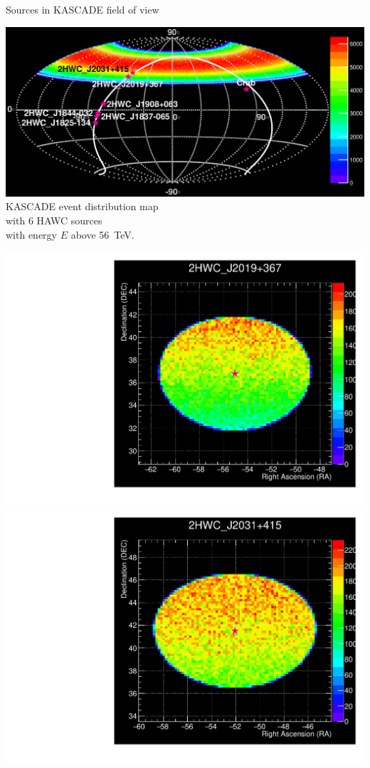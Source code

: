 \begin{frame}{Sources in KASCADE field of view}
\begin{minipage}[c]{0.73\textwidth}
\begin{center}
  \includegraphics[width=1\textwidth]{pics/Skymap_6srcs.eps}\\
  KASCADE event distribution map\\
  with 6 HAWC sources\\
  with energy $E$ above 56~TeV.
\end{center}
\end{minipage}
\hfill
\begin{minipage}[c]{0.25\textwidth}
\includegraphics[width=1\textwidth]{pics/Skymap_2HWC_J2019+367.pdf}\\
\includegraphics[width=1\textwidth]{pics/Skymap_2HWC_J2031+415.pdf}

\end{minipage}
\end{frame}
